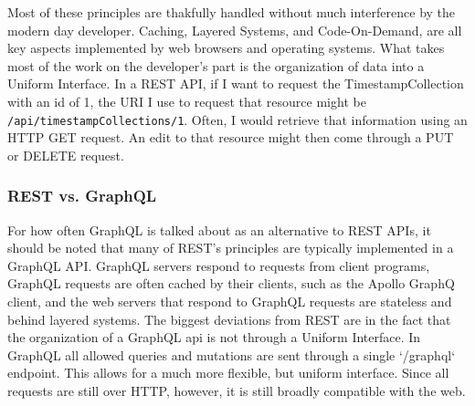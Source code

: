 Most of these principles are thakfully handled without much interference by the modern day developer. Caching, Layered Systems, and Code-On-Demand, are all key aspects implemented by web browsers and operating systems.  What takes most of the work on the developer's part is the organization of data into a Uniform Interface. In a REST API, if I want to request the TimestampCollection with an id of 1, the URI I use to request that resource might be \Verb"/api/timestampCollections/1".  Often, I would retrieve that information using an HTTP GET request.  An edit to that resource might then come through a PUT or DELETE request.

\subsubsection{REST vs. GraphQL}
For how often GraphQL is talked about as an alternative to REST APIs, it should be noted that many of REST's principles are typically implemented in a GraphQL API.  GraphQL servers respond to requests from client programs, GraphQL requests are often cached by their clients, such as the Apollo GraphQ client, and the web servers that respond to GraphQL requests are stateless and behind layered systems.  The biggest deviations from REST are in the fact that the organization of a GraphQL api is not through a Uniform Interface. In GraphQL all allowed queries and mutations are sent through a single `/graphql` endpoint.  This allows for a much more flexible, but uniform interface.  Since all requests are still over HTTP, however, it is still broadly compatible with the web.